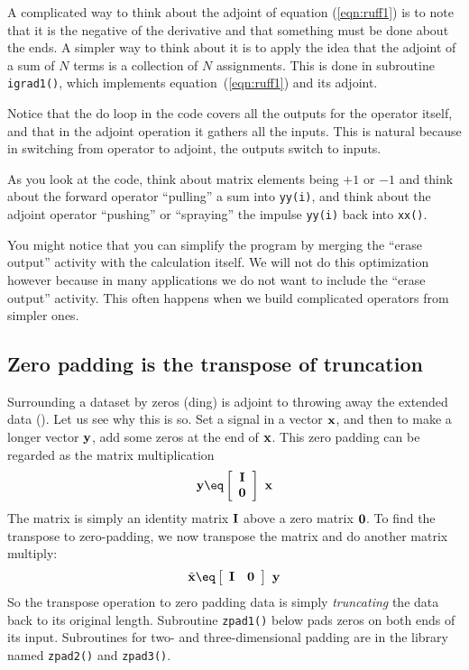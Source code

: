 A complicated way to think about the adjoint of equation
(\ref{eqn:ruff1}) is to note that it is the negative of the derivative
and that something must be done about the ends.
A simpler way to think about it
is to apply the idea that the adjoint of a sum of $N$ terms
is a collection of $N$ assignments.
This is done in subroutine \texttt{igrad1()},
which implements equation~(\ref{eqn:ruff1})
and its adjoint.
\par
\noindent
Notice that the do loop in the code
covers all the outputs for the operator itself,
and that in the adjoint operation it gathers all the inputs.
This is natural because in switching from operator
to adjoint, the outputs switch to inputs.
\par
As you look at the code,
think about matrix elements being $+1$ or $-1$ and
think about the forward operator
``pulling'' a sum into {\tt yy(i)}, and
think about the adjoint operator
``pushing'' or ``spraying'' the impulse {\tt yy(i)} back into {\tt xx()}.

\par
You might notice that you can simplify the program
by merging the ``erase output'' activity with the calculation itself.
We will not do this optimization however because in many applications
we do not want to include the ``erase output'' activity.
This often happens when we build complicated operators from simpler ones.


\subsection{Zero padding is the transpose of truncation}
Surrounding a dataset by zeros
(ding)
is adjoint to throwing away the extended data
().
Let us see why this is so.
Set a signal in a vector $\bold x$, and
then to make a longer vector $\bold y$,
add some zeros at the end of $\bold x$.
This zero padding can be regarded as the matrix multiplication
\begin{equation}
\bold y\eq
 \left[ 
  \begin{array}{c}
   \bold I \\ 
   \bold 0
  \end{array}
 \right] 
 \ 
 \bold x
\end{equation}
The matrix is simply an identity matrix $\bold I$
above a zero matrix $\bold 0$.
To find the transpose to zero-padding, we now transpose the matrix
and do another matrix multiply:
\begin{equation}
\tilde {\bold x} \eq
 \left[ 
  \begin{array}{cc}
   \bold I & \bold 0
  \end{array}
 \right] 
\ 
\bold y
\end{equation}
So the transpose operation to zero padding data
is simply {\it truncating} the data back to its original length.
Subroutine \texttt{zpad1()} below
pads zeros on both ends of its input.
Subroutines for two- and three-dimensional padding are in the
library named {\tt zpad2()} and {\tt zpad3()}.
\opdex{zpad1}{zero pad 1-D}{21}{32}{user/gee}


